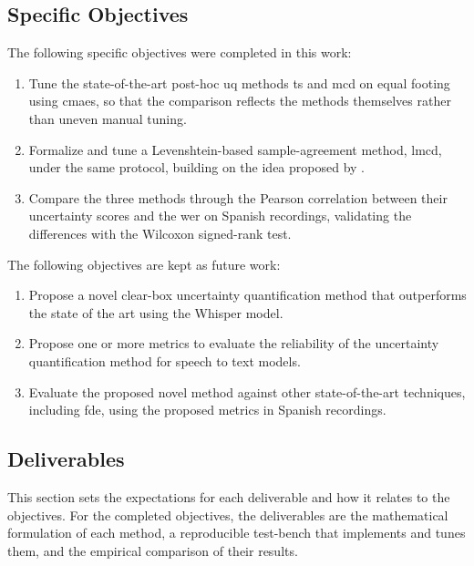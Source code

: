 \subsection{Specific Objectives}
\label{section:specific-objectives}

The following specific objectives were completed in this work:

\begin{enumerate}
    \item Tune the state-of-the-art post-hoc \acrshort{uq} methods \acrshort{ts} and \acrshort{mcd} on equal footing using \acrshort{cmaes}, so that the comparison reflects the methods themselves rather than uneven manual tuning.

    \item Formalize and tune a Levenshtein-based sample-agreement method, \acrshort{lmcd}, under the same protocol, building on the idea proposed by \cite{rodriguez2024uncertainty}.

    \item Compare the three methods through the Pearson correlation between their uncertainty scores and the \acrshort{wer} on Spanish recordings, validating the differences with the Wilcoxon signed-rank test.
\end{enumerate}

The following objectives are kept as future work:

\begin{enumerate}
    \item Propose a novel clear-box uncertainty quantification method that outperforms the state of the art using the Whisper model.

    \item Propose one or more metrics to evaluate the reliability of the uncertainty quantification method for speech to text models.

    \item Evaluate the proposed novel method against other state-of-the-art techniques, including \acrfull{fde}, using the proposed metrics in Spanish recordings.
\end{enumerate}

\subsection{Deliverables}
This section sets the expectations for each deliverable and how it relates to the objectives. For the completed objectives, the deliverables are the mathematical formulation of each method, a reproducible test-bench that implements and tunes them, and the empirical comparison of their results.

